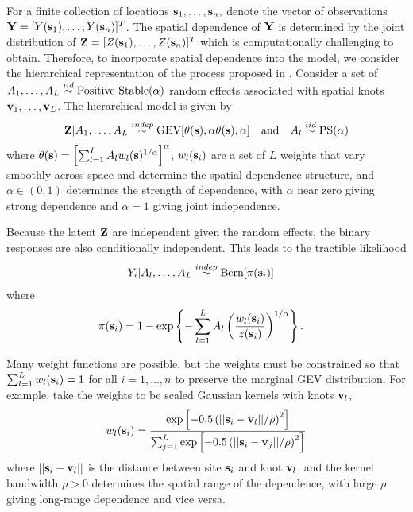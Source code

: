 \documentclass[11pt]{article}
\begin{document}
For a finite collection of locations $\mbox{\bf s}_1, \ldots, \mbox{\bf s}_n,$ denote the vector of observations $\mbox{\bf Y} = [Y(\mbox{\bf s}_1), \ldots, Y(\mbox{\bf s}_n)]^T$.
The spatial dependence of $\mbox{\bf Y}$ is determined by the joint distribution of $\mbox{\bf Z} = [Z(\mbox{\bf s}_1),\ldots, Z(\mbox{\bf s}_n)]^T$ which is computationally challenging to obtain.
Therefore, to incorporate spatial dependence into the model, we consider the hierarchical representation of the process proposed in \citet{Reich2012}.
Consider a set of $A_1, \ldots, A_L \stackrel{iid}{\sim} \text{Positive Stable}(\alpha)$ random effects associated with spatial knots $\mbox{\bf v}_1, \ldots, \mbox{\bf v}_L$.
The hierarchical model is given by
\begin{align} \label{rbeq:hiermodel}
  \mbox{\bf Z} | A_1, \ldots, A_L \stackrel{indep}{\sim} \text{GEV}[\theta(\mbox{\bf s}), \alpha \theta(\mbox{\bf s}), \alpha] \quad \text{and} \quad A_l \stackrel{iid}{\sim} \text{PS}(\alpha)
\end{align}
where $\theta(\mbox{\bf s}) = \left[\sum_{l = 1}^L A_l w_l (\mbox{\bf s})^{1 / \alpha} \right]^\alpha$, $w_{l}(\mbox{\bf s}_i)$ are a set of $L$ weights that vary smoothly across space and determine the spatial dependence structure, and $\alpha\in(0,1)$ determines the strength of dependence, with $\alpha$ near zero giving strong dependence and $\alpha=1$ giving joint independence.

Because the latent $\mbox{\bf Z}$ are independent given the random effects, the binary responses are also conditionally independent.
This leads to the tractible likelihood
\begin{align} \label{rbeq:condlike}
  Y_i | A_l, \ldots, A_L &\stackrel{indep}{\sim} \text{Bern}[\pi(\mbox{\bf s}_i)]
\end{align}
where
\begin{align} \label{rbeq:pyeq1cond}
  \pi(\mbox{\bf s}_i) &= 1 - \exp \left\{ -\displaystyle \sum_{ l = 1 }^{L} A_l \left( \frac{ w_{l}(\mbox{\bf s}_i) }{ z(\mbox{\bf s}_i) } \right)^{ 1/\alpha} \right\}.
\end{align}

Many weight functions are possible, but the weights must be constrained so that $\sum_{l=1}^L w_{l}(\mbox{\bf s}_i)=1$ for all $i=1,\ldots,n$ to preserve the marginal GEV distribution.
For example, \cite{Reich2012} take the weights to be scaled Gaussian kernels with knots $\mbox{\bf v}_l$,
\begin{align}\label{rbeq:w}
   w_{l}(\mbox{\bf s}_i) = \frac{\exp\left[-0.5\left(||\mbox{\bf s}_i-\mbox{\bf v}_l||/\rho\right)^2\right]}
                 {\sum_{j=1}^L\exp\left[-0.5\left(||\mbox{\bf s}_i-\mbox{\bf v}_j||/\rho\right)^2\right]}
\end{align}
where $||\mbox{\bf s}_i - \mbox{\bf v}_l||$ is the distance between site $\mbox{\bf s}_i$ and knot $\mbox{\bf v}_l$, and the kernel bandwidth $\rho>0$ determines the spatial range of the dependence, with large $\rho$ giving long-range dependence and vice versa.
\end{document}
